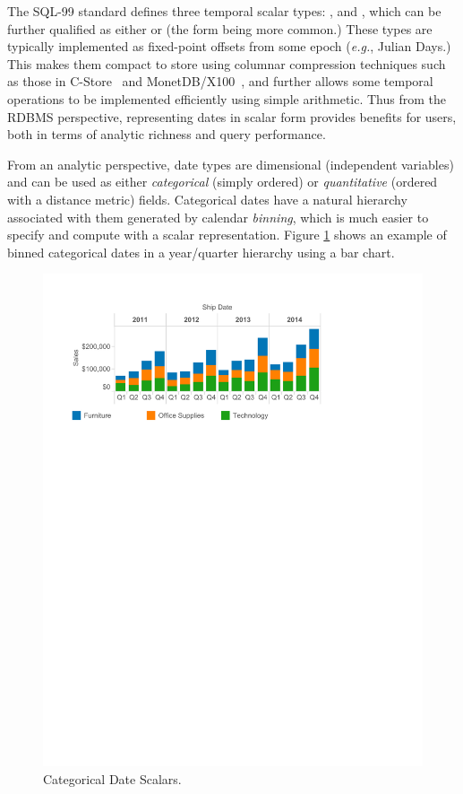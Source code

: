 The SQL-99 standard defines three temporal scalar types: ,  and , 
which can be further qualified as either  or   (the  form being more common.) 
These types are typically implemented as fixed-point offsets from some epoch (\textit{e.g.}, Julian Days.) 
This makes them compact to store using columnar compression techniques such as those in C-Store~\cite{Stonebraker:2005} and MonetDB/X100~\cite{Zukowski:2006}, 
and further allows some temporal operations to be implemented efficiently using simple arithmetic. 
Thus from the RDBMS perspective, representing dates in scalar form provides benefits for users, both in terms of analytic richness and query performance.

From an analytic perspective, date types are dimensional (\ie independent variables) and can be used as either \emph{categorical} (simply ordered) or \emph{quantitative} (ordered with a distance metric) fields.
Categorical dates have a natural hierarchy associated with them generated by calendar \emph{binning}, which is much easier to specify and compute with a scalar representation.
Figure \ref{fig:I1} shows an example of binned categorical dates in a year/quarter hierarchy using a bar chart.

\begin{figure}[ht]
\centering
\includegraphics[width=\columnwidth]{figures/FigureI1}
\caption{Categorical Date Scalars.}
\label{fig:I1}
\end{figure}

